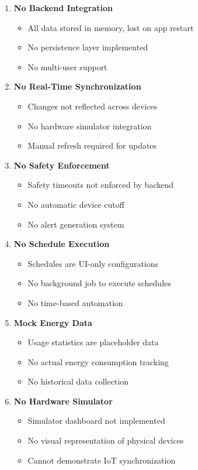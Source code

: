 \documentclass[12pt,a4paper]{article}
\begin{document}
\begin{enumerate}[leftmargin=*]
    \item \textbf{No Backend Integration}
    \begin{itemize}
        \item All data stored in memory, lost on app restart
        \item No persistence layer implemented
        \item No multi-user support
    \end{itemize}
    
    \item \textbf{No Real-Time Synchronization}
    \begin{itemize}
        \item Changes not reflected across devices
        \item No hardware simulator integration
        \item Manual refresh required for updates
    \end{itemize}
    
    \item \textbf{No Safety Enforcement}
    \begin{itemize}
        \item Safety timeouts not enforced by backend
        \item No automatic device cutoff
        \item No alert generation system
    \end{itemize}
    
    \item \textbf{No Schedule Execution}
    \begin{itemize}
        \item Schedules are UI-only configurations
        \item No background job to execute schedules
        \item No time-based automation
    \end{itemize}
    
    \item \textbf{Mock Energy Data}
    \begin{itemize}
        \item Usage statistics are placeholder data
        \item No actual energy consumption tracking
        \item No historical data collection
    \end{itemize}
    
    \item \textbf{No Hardware Simulator}
    \begin{itemize}
        \item Simulator dashboard not implemented
        \item No visual representation of physical devices
        \item Cannot demonstrate IoT synchronization
    \end{itemize}
\end{enumerate}
\end{document}
